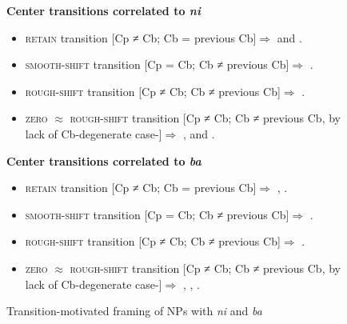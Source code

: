 \documentclass[output=paper
,modfonts
,nonflat]{langsci/langscibook}
\begin{document}
\begin{figure}[H] 
	\centering 
	\caption{Transition-motivated framing of NPs with \textit{ni} and \textit{ba}} 
	\label{fig:pico:3}
	\textbf{Center transitions correlated to \textit{ni}}
	\begin{itemize} 
		
		\item \textsc{retain} transition [Cp ≠ Cb; Cb = previous Cb]$\Rightarrow$  and .
		
		\item \textsc{smooth-shift} transition [Cp = Cb; Cb ≠ previous Cb]$\Rightarrow$  .
		
		\item \textsc{rough-shift} transition [Cp ≠ Cb; Cb ≠ previous Cb]$\Rightarrow$  .
		
		\item \textsc{zero} $\approx$ \textsc{rough-shift} transition [Cp ≠ Cb; Cb ≠ previous Cb, by lack of Cb\linebreak -degenerate case-]$\Rightarrow$ ,  and .
		
	\end{itemize}
	
	
	
	\textbf{Center transitions correlated to \textit{ba}}
	\begin{itemize}
		
		\item \textsc{retain} transition [Cp ≠ Cb; Cb = previous Cb]$\Rightarrow$ , .
		
		\item \textsc{smooth-shift} transition [Cp = Cb; Cb ≠ previous Cb]$\Rightarrow$ .
		
		\item \textsc{rough-shift} transition [Cp ≠ Cb; Cb ≠ previous Cb]$\Rightarrow$ .
		
		\item \textsc{zero} $\approx$ \textsc{rough-shift} transition [Cp ≠ Cb; Cb ≠ previous Cb, by lack of Cb\linebreak -degenerate case-]$\Rightarrow$ , , .
	\end{itemize}
\end{figure}
\end{document}
